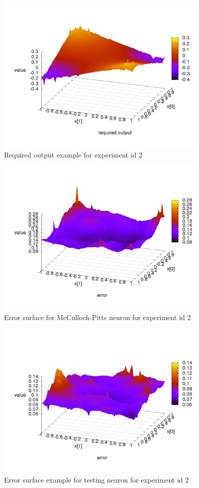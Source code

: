 \documentclass[10pt,a5paper]{article}
\begin{document}
\begin{figure}[!ht]
\centering
\includegraphics[width=4.0in]{images/result_log_required_output.png}
\caption{Required output example for experiment id 2}
\label{img:NN required output example for experiment id 2}
\end{figure}


\begin{figure}[!ht]
\centering
\includegraphics[width=4.0in]{images/mcculloch_pitts_tanh_neuron_1_layer_result_log_output_error.png}
\caption{Error surface for McCulloch-Pitts neuron for experiment id 2}
\label{img:NN error example 02}
\end{figure}


\begin{figure}[!ht]
\centering
\includegraphics[width=4.0in]{images/testing_neuron_1_layer_result_log_output_error.png}
\caption{Error surface example for testing neuron for experiment id 2}
\label{img:NN error example 01}
\end{figure}
\end{document}
